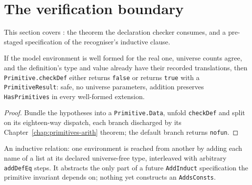 \section{The verification boundary}

This section covers : the theorem the
declaration checker consumes, and a pre-staged specification of the recogniser's inductive
clause.

\begin{theorem}
\label{vpc:thm:checkdef-wf}\leanok
{}

 If the model environment is well formed for the real one, universe counts agree,
and the definition's type and value already have their recorded translations, then
\texttt{Primitive.checkDef} either returns \texttt{false} or returns \texttt{true} with a
\texttt{PrimitiveResult}: safe, no universe parameters, addition preserves
\texttt{HasPrimitives} in every well-formed extension.
\end{theorem}
\begin{proof}\leanok
{}
 Bundle the hypotheses into a \texttt{Primitive.Data}, unfold \texttt{checkDef} and
split on its eighteen-way dispatch, each branch discharged by its
Chapter~\ref{chap:primitives-arith} theorem; the default branch returns \texttt{nofun}.
\end{proof}

\begin{definition}
\label{vpc:ind:addsconsts}\leanok
{}

 An inductive relation: one environment is reached from another by adding each
name of a list at its declared universe-free type, interleaved with arbitrary
\texttt{addDefEq} steps.
 It abstracts the only part of a future \texttt{AddInduct} specification the
primitive invariant depends on; nothing yet constructs an \texttt{AddsConsts}.
\end{definition}

